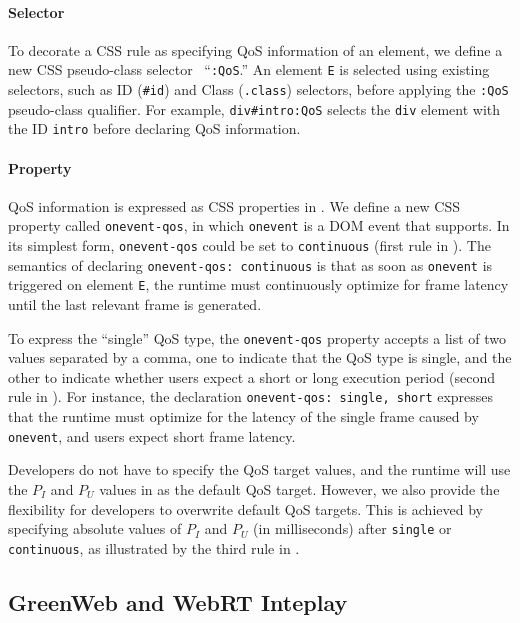 \paragraph{Selector} To decorate a CSS rule as specifying QoS information of an element, we define a new CSS pseudo-class selector~\cite{css_pseudo_class} ``\texttt{:QoS}.'' An element \texttt{E} is selected using existing selectors, such as ID (\texttt{\#id}) and Class (\texttt{.class}) selectors, before applying the \texttt{:QoS} pseudo-class qualifier. For example, \texttt{div\#intro:QoS} selects the \texttt{div} element with the ID \texttt{intro} before declaring QoS information.

\paragraph{Property} QoS information is expressed as CSS properties in \greenweb. We define a new CSS property called \texttt{onevent-qos}, in which \texttt{onevent} is a DOM event that \greenweb supports. In its simplest form, \texttt{onevent-qos} could be set to \texttt{continuous} (first rule in ). The semantics of declaring \texttt{onevent-qos: continuous} is that as soon as \texttt{onevent} is triggered on element \texttt{E}, the runtime must continuously optimize for frame latency until the last relevant frame is generated.

To express the ``single'' QoS type, the \texttt{onevent-qos} property accepts a list of two values separated by a comma, one to indicate that the QoS type is single, and the other to indicate whether users expect a short or long execution period (second rule in ). For instance, the declaration \texttt{onevent-qos: single, short} expresses that the runtime must optimize for the latency of the single frame caused by \texttt{onevent}, and users expect short frame latency.

Developers do not have to specify the QoS target values, and the \greenweb runtime will use the $P_I$ and $P_U$ values in  as the default QoS target. However, we also provide the flexibility for developers to overwrite default QoS targets. This is achieved by specifying absolute values of $P_I$ and $P_U$ (in milliseconds) after \texttt{single} or \texttt{continuous}, as illustrated by the third rule in .

\subsection{GreenWeb and WebRT Inteplay}
\label{sec:lang:inter}

